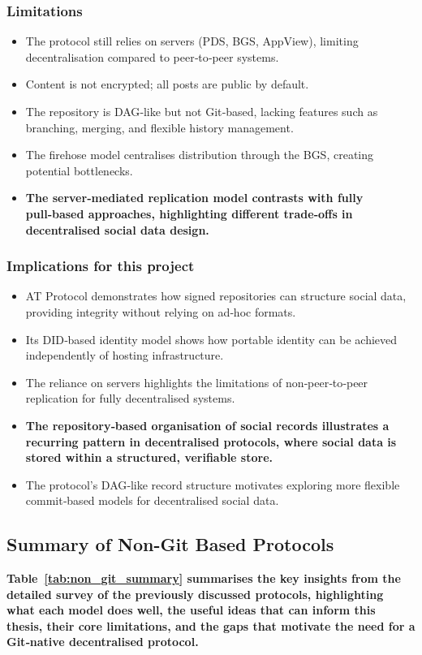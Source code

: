 \subsubsection{Limitations}
\begin{itemize}
    \item The protocol still relies on servers (PDS, BGS, AppView), limiting decentralisation compared to peer‑to‑peer systems.
    \item Content is not encrypted; all posts are public by default.
    \item The repository is DAG‑like but not Git‑based, lacking features such as branching, merging, and flexible history management.
    \item The firehose model centralises distribution through the BGS, creating potential bottlenecks.
    \item \textbf{The server‑mediated replication model contrasts with fully pull‑based approaches, highlighting different trade‑offs in decentralised social data design.}
\end{itemize}

\subsubsection{Implications for this project}
\begin{itemize}
    \item AT Protocol demonstrates how signed repositories can structure social data, providing integrity without relying on ad‑hoc formats.
    \item Its DID‑based identity model shows how portable identity can be achieved independently of hosting infrastructure.
    \item The reliance on servers highlights the limitations of non‑peer‑to‑peer replication for fully decentralised systems.
    \item \textbf{The repository‑based organisation of social records illustrates a recurring pattern in decentralised protocols, where social data is stored within a structured, verifiable store.}
    \item The protocol’s DAG‑like record structure motivates exploring more flexible commit‑based models for decentralised social data.
\end{itemize}

\subsection*{Summary of Non-Git Based Protocols}
\textbf{Table~\ref{tab:non_git_summary} summarises the key insights from the detailed survey of the
previously discussed protocols, highlighting what each model does well, the useful ideas that can
inform this thesis, their core limitations, and the gaps that motivate the need for a Git‑native
decentralised protocol.}

